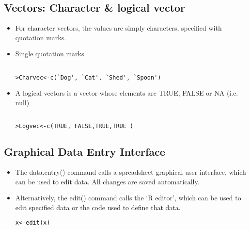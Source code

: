 \subsection{Vectors: Character \& logical vector}

\begin{itemize}
\item For character vectors, the values are simply characters,
specified with quotation marks.
\item Single quotation marks
\begin{verbatim}

>Charvec<-c(`Dog', `Cat', `Shed', `Spoon')

\end{verbatim}

\item A logical vectors is a vector whose elements are TRUE, FALSE
or NA (i.e. null)
\begin{verbatim}

>Logvec<-c(TRUE, FALSE,TRUE,TRUE )

\end{verbatim}

\end{itemize}

\subsection{Graphical Data Entry Interface}
\begin{itemize}

\item The data.entry() command calls a spreadsheet graphical user
interface, which can be used to edit data. All changes are saved
automatically.




\item Alternatively, the edit() command calls the `R editor',
which can be used to edit specified data or the code used to
define that data.

\begin{verbatim}
x<-edit(x)
\end{verbatim}

\end{itemize}




